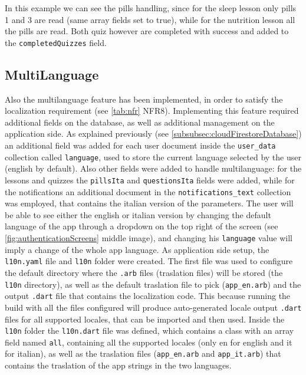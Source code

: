 \noindent In this example we can see the pills handling, since for the sleep lesson only pills 1 and 3 are read (same array fields set to true), while for the nutrition lesson all the pills are read. Both quiz however are completed with success and added to the \texttt{completedQuizzes} field.
\subsection{MultiLanguage}
Also the multilanguage feature has been implemented, in order to satisfy the localization requirement (see \cref{tab:nfr} NFR8). Implementing this feature required additional fields on the database, as well as additional management on the application side. 
As explained previously (see \cref{subsubsec:cloudFirestoreDatabase}) an additional field was added for each user document inside the \texttt{user\_data} collection called \texttt{language}, used to store the current language selected by the user (english by default). Also other fields were added to handle multilanguage: for the lessons and quizzes the \texttt{pillsIta} and \texttt{questionsIta} fields were added, while for the notifications an additional document in the \texttt{notifications\_text} collection was employed, that contains the italian version of the parameters. The user will be able to see either the english or italian version by changing the default language of the app through a dropdown on the top right of the screen (see \cref{fig:authenticationScreens} middle image), and changing his \texttt{language} value will imply a change of the whole app language. 
\newline As application side setup, the \texttt{l10n.yaml} file and \texttt{l10n} folder were created. The first file was used to configure the default directory where the \texttt{.arb} files (traslation files) will be stored (the \texttt{l10n} directory), as well as the default traslation file to pick (\texttt{app\_en.arb}) and the output \texttt{.dart} file that contains the localization code. This because running the build with all the files configured will produce auto-generated locale output \texttt{.dart} files for all supported locales, that can be imported and then used. Inside the \texttt{l10n} folder the \texttt{l10n.dart} file was defined, which contains a class with an array field named \texttt{all}, containing all the supported locales (only en for english and it for italian), as well as the traslation files (\texttt{app\_en.arb} and \texttt{app\_it.arb}) that contains the traslation of the app strings in the two languages.
